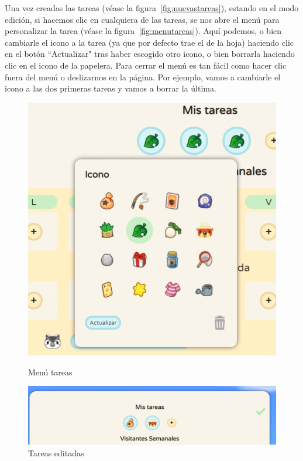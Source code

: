 \clearpage


Una vez creadas las tareas {(v\'ease la figura~\ref{fig:nuevastareas})}, estando en el modo edición, si hacemos clic en cualquiera de las tareas, se nos abre el menú para personalizar la tarea {(v\'ease la figura~\ref{fig:menutareas})}. Aquí podemos, o bien cambiarle el icono a la tarea (ya que por defecto trae el de la hoja) haciendo clic en el botón ``Actualizar" tras haber escogido otro icono, o bien borrarla haciendo clic en el icono de la papelera. Para cerrar el menú es tan fácil como hacer clic fuera del menú o deslizarnos en la página. Por ejemplo, vamos a cambiarle el icono a las dos primeras tareas y vamos a borrar la última.\\

\begin{figure}[!htb]
	\begin{minipage}{0.48\textwidth}
		\centering
		\includegraphics[width=.6\linewidth]{img/cap9/33-menu-tareas.png}
		\caption{Menú tareas}
		\label{fig:menutareas}
	\end{minipage}\hfill
	\begin{minipage}{0.48\textwidth}
		\centering
		\includegraphics[width=\linewidth]{img/cap9/34-dos-tareas.png}
		\caption{Tareas editadas}
		\label{fig:tareaseditadas}
	\end{minipage}
\end{figure}

